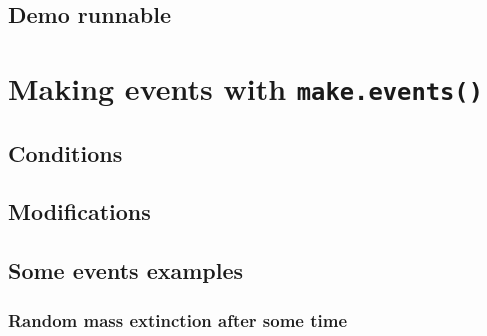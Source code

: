 \documentclass[]{book}
\begin{document}
\hypertarget{demo-runnable}{%
\section{Demo runnable}\label{demo-runnable}}

\hypertarget{makeevents}{%
\chapter{\texorpdfstring{Making events with \texttt{make.events()}}{Making events with make.events()}}\label{makeevents}}

\hypertarget{conditions}{%
\section{Conditions}\label{conditions}}

\hypertarget{modifications}{%
\section{Modifications}\label{modifications}}

\hypertarget{some-events-examples}{%
\section{Some events examples}\label{some-events-examples}}

\hypertarget{random-mass-extinction-after-some-time}{%
\subsection{Random mass extinction after some time}\label{random-mass-extinction-after-some-time}}
\end{document}

